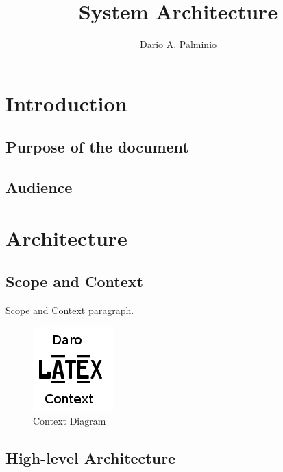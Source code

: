 \documentclass[a4paper,11pt]{book}
\title{System Architecture}
\author{Dario A. Palminio}
\begin{document}
\maketitle
\tableofcontents

\chapter{Introduction}

\section{Purpose of the document}

\section{Audience}

\chapter{Architecture}

\section{Scope and Context}

Scope and Context paragraph.

\begin{figure}[h] %
  \includegraphics{image_001}
  \caption{Context Diagram}
  \centering
  \label{fig:context} %
\end{figure}

\section{High-level Architecture}
\end{document}
